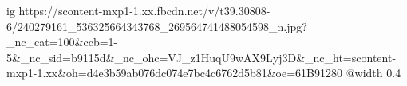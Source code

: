  
 
 
 
 

\ifcmt
  ig https://scontent-mxp1-1.xx.fbcdn.net/v/t39.30808-6/240279161_536325664343768_269564741488054598_n.jpg?_nc_cat=100&ccb=1-5&_nc_sid=b9115d&_nc_ohc=VJ_z1HuqU9wAX9Lyj3D&_nc_ht=scontent-mxp1-1.xx&oh=d4e3b59ab076dc074e7bc4c6762d5b81&oe=61B91280
  @width 0.4
\fi
